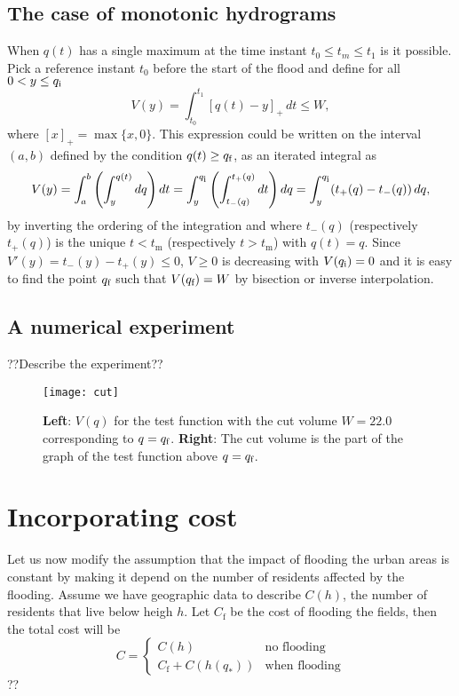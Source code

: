 \subsection{The case of monotonic hydrograms}

When $q(t)$ has a single maximum at the time instant $t_{0}\leq t_{m}\leq t_{1}$
is it possible. Pick a reference instant $t_{0}$ before the start
of the flood and define for all $0<y\leq q_{\mbox{\rm\scriptsize i}}$ \[
V(y)=\int_{t_{0}}^{t_{1}}\left[q(t)-y\right]_{+}\, dt\leq W,\]
where $\left[x\right]_{+}=\max\{x,0\}$. This expression could be
written on the interval $(a,b)$ defined by the condition $q(t)\geq q_{\mbox{\rm\scriptsize f}}$,
as an iterated integral as\[
V(y)=\int_{a}^{b}\left(\int_{y}^{q(t)}dq\right)dt=\int_{y}^{q_{\mbox{\rm\scriptsize i}}}\left(\int_{t_{-}(q)}^{t_{+}(q)}dt\right)dq=\int_{y}^{q_{\mbox{\rm\scriptsize i}}}(t_{+}(q)-t_{-}(q))\, dq,\]
by inverting the ordering of the integration and where $t_{-}(q)$
(respectively $t_{+}(q)$) is the unique $t<t_{\mbox{m}}$ (respectively
$t>t_{\mbox{m}}$) with $q(t)=q$. Since $V'(y)=t_{-}(y)-t_{+}(y)\leq0$,
$V\geq0$ is decreasing with $V(q_{\mbox{\rm\scriptsize i}})=0$ and it is easy to find the
point $q_{\mbox{\rm\scriptsize f}}$ such that $V(q_{\mbox{\rm\scriptsize f}})=W$ by bisection or inverse interpolation.


\subsection{A numerical experiment}

??Describe the experiment??

%
\begin{figure}


\begin{centering}
\texttt{[image: cut]}
\par\end{centering}

\caption{\textbf{Left}: $V(q)$ for the test function with the cut volume $W=22.0$
corresponding to $q=q_{\mbox{\rm\scriptsize f}}$.\textbf{ Right}: The cut volume is the part
of the graph of the test function above $q=q_{\mbox{\rm\scriptsize f}}$. }

\end{figure}



\section{Incorporating cost}

Let us now modify the assumption that the impact of flooding the urban
areas is constant by making it depend on the number of residents affected
by the flooding. Assume we have geographic data to describe $C(h)$,
the number of residents that live below heigh $h$. Let $C_{\mbox{f}}$
be the cost of flooding the fields, then the total cost will be \[
C=\left\{ \begin{array}{cc}
C(h) & \mbox{no flooding}\\
C_{\mbox{f}}+C(h(q_{*})) & \mbox{when flooding}\end{array}\right.\]
?? 

